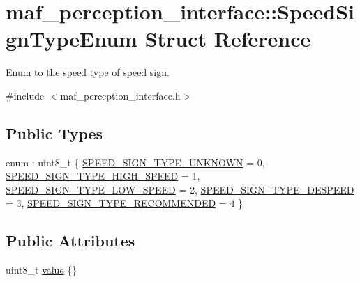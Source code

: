 \hypertarget{structmaf__perception__interface_1_1SpeedSignTypeEnum}{}\section{maf\+\_\+perception\+\_\+interface\+:\+:Speed\+Sign\+Type\+Enum Struct Reference}
\label{structmaf__perception__interface_1_1SpeedSignTypeEnum}


Enum to the speed type of speed sign.  




{\ttfamily \#include $<$maf\+\_\+perception\+\_\+interface.\+h$>$}

\subsection*{Public Types}
\begin{DoxyCompactItemize}
\item 
enum \+: uint8\+\_\+t \{ \newline
\hyperlink{structmaf__perception__interface_1_1SpeedSignTypeEnum_afc86be0b24f97e8605903ea0f2e21cada05f4d086d1cdf26829ddec8d4f39edcd}{S\+P\+E\+E\+D\+\_\+\+S\+I\+G\+N\+\_\+\+T\+Y\+P\+E\+\_\+\+U\+N\+K\+N\+O\+WN} = 0, 
\hyperlink{structmaf__perception__interface_1_1SpeedSignTypeEnum_afc86be0b24f97e8605903ea0f2e21cadaa60fd576fc9e69918e74402dab511830}{S\+P\+E\+E\+D\+\_\+\+S\+I\+G\+N\+\_\+\+T\+Y\+P\+E\+\_\+\+H\+I\+G\+H\+\_\+\+S\+P\+E\+ED} = 1, 
\hyperlink{structmaf__perception__interface_1_1SpeedSignTypeEnum_afc86be0b24f97e8605903ea0f2e21cadab3fb65b4189a0a4b97bcf3192a382efd}{S\+P\+E\+E\+D\+\_\+\+S\+I\+G\+N\+\_\+\+T\+Y\+P\+E\+\_\+\+L\+O\+W\+\_\+\+S\+P\+E\+ED} = 2, 
\hyperlink{structmaf__perception__interface_1_1SpeedSignTypeEnum_afc86be0b24f97e8605903ea0f2e21cadad63431b4c660a0722af68f658b0d44da}{S\+P\+E\+E\+D\+\_\+\+S\+I\+G\+N\+\_\+\+T\+Y\+P\+E\+\_\+\+D\+E\+S\+P\+E\+ED} = 3, 
\newline
\hyperlink{structmaf__perception__interface_1_1SpeedSignTypeEnum_afc86be0b24f97e8605903ea0f2e21cadad32c7e9f1955caf19100bee89eb33a2a}{S\+P\+E\+E\+D\+\_\+\+S\+I\+G\+N\+\_\+\+T\+Y\+P\+E\+\_\+\+R\+E\+C\+O\+M\+M\+E\+N\+D\+ED} = 4
 \}
\end{DoxyCompactItemize}
\subsection*{Public Attributes}
\begin{DoxyCompactItemize}
\item 
uint8\+\_\+t \hyperlink{structmaf__perception__interface_1_1SpeedSignTypeEnum_a460c2867853288f9826c2bd9daf5dcf6}{value} \{\}
\end{DoxyCompactItemize}


